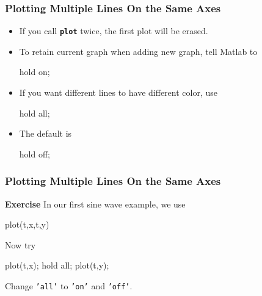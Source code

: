 \documentclass[compress]{beamer}  %
\newcommand{\tttbf}[1]{\texttt{\textbf{#1}}} %
\begin{document}
\begin{frame}[fragile]
\frametitle{Plotting Multiple Lines On the Same Axes}
\begin{itemize}[<+->]
    \item If you call \tttbf{plot} twice, the first plot will be erased.
    
    \item To retain current graph when adding new graph, tell Matlab to
          \begin{matlabcode}[frame=none]
          hold on;
          \end{matlabcode}
          
    \item If you want different lines to have different color, use
          \begin{matlabcode}[frame=none]
          hold all;
          \end{matlabcode}
          
    \item The default is
          \begin{matlabcode}[frame=none]
          hold off;
          \end{matlabcode}
\end{itemize}

\end{frame}
\begin{frame}[fragile]
\frametitle{Plotting Multiple Lines On the Same Axes}
\textbf{Exercise}
In our first sine wave example, we use
\begin{matlabcode}[frame=none]
          plot(t,x,t,y)
\end{matlabcode}\pause
          
Now try
\begin{matlabcode}[frame=none]
          plot(t,x);
          hold all;
          plot(t,y);
\end{matlabcode}

Change \texttt{'all'} to \texttt{'on'} and \texttt{'off'}.

\end{frame}
\end{document}
